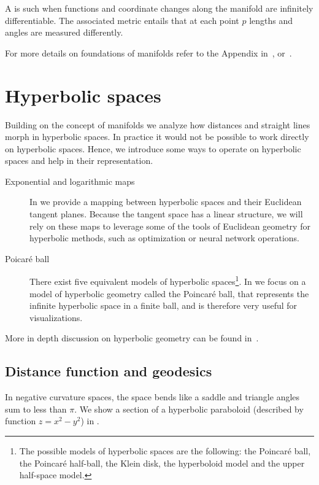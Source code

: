 A  is such when functions and coordinate changes along the manifold are infinitely differentiable. The associated metric entails that at each point $p$ lengths and angles are measured differently.

For more details on foundations of manifolds refer to the Appendix in~\cite{Chami2021representationLearningAlgorithmsHyperbolicSpaces}, or~\cite{doCarmo1992riemannianGeometry}\cite{Lee2003smooth}.


\section{Hyperbolic spaces}
Building on the concept of manifolds we analyze how distances and straight lines morph in hyperbolic spaces. In practice it would not be possible to work directly on hyperbolic spaces. Hence, we introduce some ways to operate on hyperbolic spaces and help in their representation.
\begin{description}
    \item[Exponential and logarithmic maps] In  we provide a mapping between hyperbolic spaces and their Euclidean tangent planes. Because the tangent space has a linear structure, we will rely on these maps to leverage some of the tools of Euclidean geometry for hyperbolic methods, such as optimization or neural network operations.
    \item[Poicaré ball] There exist five equivalent models of hyperbolic spaces\footnote{The possible models of hyperbolic spaces are the following: the Poincaré ball, the Poincaré half-ball, the Klein disk, the hyperboloid model and the upper half-space model.}. In  we focus on a model of hyperbolic geometry called the Poincaré ball, that represents the infinite hyperbolic space in a finite ball, and is therefore very useful for visualizations.
\end{description}

More in depth discussion on hyperbolic geometry can be found in~\cite{Anderson2006hyperbolicGeometry}\cite{Ramsay2013introductionHyperbolicGeometry}.

\subsection{Distance function and geodesics}
In negative curvature spaces, the space bends like a saddle and triangle angles sum to less than $\pi$. We show a section of a hyperbolic paraboloid (described by function $z=x^2-y^2$) in .

